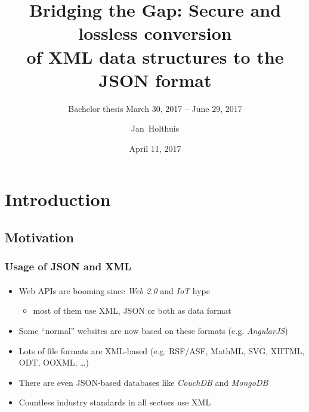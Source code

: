\documentclass[
    alternativetitlepage=alternativ,
    cornerlogo=hgi_nds_logo2,
    sectionoverview,
]{rubpresentation}
\title[XML/JSON conversions]
{Bridging the Gap: Secure and lossless conversion\\ of XML data structures to the JSON format}
\subtitle{\small Bachelor thesis \hspace{3mm}{\scriptsize $\blacksquare$}\hspace{3mm} March 30, 2017 -- June 29, 2017}
\author[Holthuis]{Jan~Holthuis}
\institute[Advisors]
{%
Advisors: Dennis Felsch \& Paul Rösler
}
\date{April 11, 2017}
\begin{document}
\frame[plain]{\titlepage}




\section{Introduction}


\subsection{Motivation}

\begin{frame}
    \frametitle{Usage of JSON and XML}
    \framesubtitle{}
    \begin{itemize}
        \item{} Web APIs are booming since \emph{Web 2.0} and \emph{IoT} hype
            \begin{itemize}
                \item{} most of them use XML, JSON or both as data format
            \end{itemize}
        \item{} Some \enquote{normal} websites are now based on these formats (e.g. \emph{AngularJS})\\
        \item{} Lots of file formats are XML-based (e.g. RSF/ASF, MathML, SVG, XHTML, ODT, OOXML, \ldots{})\\
        \item{} There are even JSON-based databases like \emph{CouchDB} and \emph{MongoDB}\\
        \item{} Countless industry standards in all sectors use XML
    \end{itemize}
\end{frame}
\end{document}
